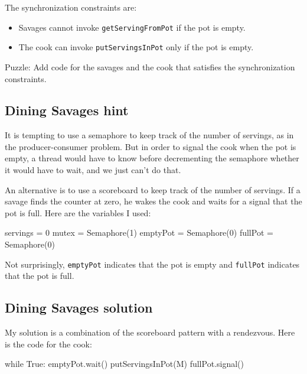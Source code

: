 \documentclass{book}
\begin{document}
The synchronization constraints are:

\begin{itemize}

    \item Savages cannot invoke {\tt getServingFromPot} if the
          pot is empty.

    \item The cook can invoke {\tt putServingsInPot} only if
          the pot is empty.

\end{itemize}

Puzzle: Add code for the savages and the cook that
satisfies the synchronization constraints.



\subsection{Dining Savages hint}

It is tempting to use a semaphore to keep track of the number of
servings, as in the producer-consumer problem.  But in order to signal
the cook when the pot is empty, a thread would have to know before
decrementing the semaphore whether it would have to wait, and we just
can't do that.

An alternative is to use a scoreboard to
keep track of the number of servings.  If a savage finds
the counter at zero, he wakes the cook and waits for a signal
that the pot is full.  Here are the variables I used:

\begin{unbreakable}[title={Dining Savages hint}]{}
servings = 0
mutex = Semaphore(1)
emptyPot = Semaphore(0)
fullPot = Semaphore(0)
\end{unbreakable}

Not surprisingly, {\tt emptyPot} indicates that the pot is empty and
    {\tt fullPot} indicates that the pot is full.


\subsection{Dining Savages solution}

My solution is a combination of the scoreboard pattern
with a rendezvous.
Here is the code for the cook:

\begin{unbreakable}[title={Dining Savages solution (cook)}]{}
while True:
    emptyPot.wait()
    putServingsInPot(M)
    fullPot.signal()
\end{unbreakable}
\end{document}
